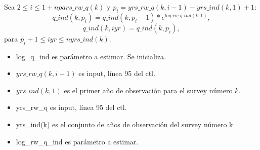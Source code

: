 \documentclass{article}
\begin{document}
Sea $2\leq i \leq 1+npars\_rw\_q(k)$ y $p_i=yrs\_rw\_q(k,i-1)-yrs\_ind(k,1)+1$:
\begin{equation}
     q\_ind(k,p_i)  = q\_ind(k,p_i-1)*e^{log\_rw\_q\_ind(k,1)},
\end{equation}
\begin{equation}
    q\_ind(k,iyr)  = q\_ind(k,p_i), 
\end{equation}
para $p_i+1\leq iyr \leq nyrs\_ind(k).$
\begin{itemize}
    \item log\_q\_ind es parámetro a estimar. Se inicializa.
    \item $yrs\_rw\_q(k,i-1)$ es input, línea 95 del ctl.
    \item $yrs\_ind(k,1)$ es el primer año de observación para el survey número $k$.
    \item yrs\_rw\_q es input, línea 95 del ctl.
    \item yrs\_ind(k) es el conjunto de años de observación del survey número k. 
    \item log\_rw\_q\_ind es parámetro a estimar.
\end{itemize}
\end{document}
